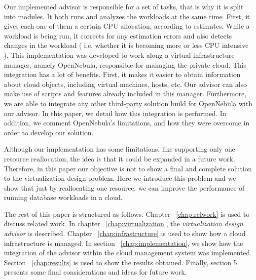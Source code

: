 Our implemented advisor is responsible for a set of tasks, that is why it is split into modules. It both runs and analyzes the workloads  at the same time. First, it gives each one of them a certain CPU allocation, according to estimates. While a workload is being run, it corrects for any estimation errors and also detects changes in the workload ( i.e. whether it is becoming more or less CPU intensive ). This implementation was developed to work along a virtual infrastructure manager, namely OpenNebula, responsible for managing the private cloud. This integration has a lot of benefits. First, it makes it easier to obtain information about cloud objects, including virtual machines, hosts, etc. Our advisor can also make use of scripts and features already included in this manager. Furthermore, we are able to integrate any other third-party solution build for OpenNebula with our advisor. In this paper, we detail how this integration is performed. In addition, we comment OpenNebula's limitations, and how they were overcome in order to develop our solution.

Although our implementation has some limitations, like supporting only one resource reallocation, the idea is that it could be expanded in a future work. Therefore, in this paper our objective is not to show a final and complete solution to the virtualization design problem. Here we introduce this problem and we show that just by reallocating one resource, we can improve the performance of running database workloads in a cloud. 

The rest of this paper is structured as follows. Chapter ~\ref{chap:relwork} is used to discuss related work. In chapter ~\ref{chap:virtualization}, the \textit{virtualization design advisor} is described. Chapter ~\ref{chap:infrastructure} is used to show how a cloud infrastructure is managed. In section ~\ref{chap:implementation}, we show how the integration of the advisor within the cloud management system was implemented. Section ~\ref{chap:results} is used to show the results obtained. Finally, section 5 presents some final considerations and ideas for future work.

